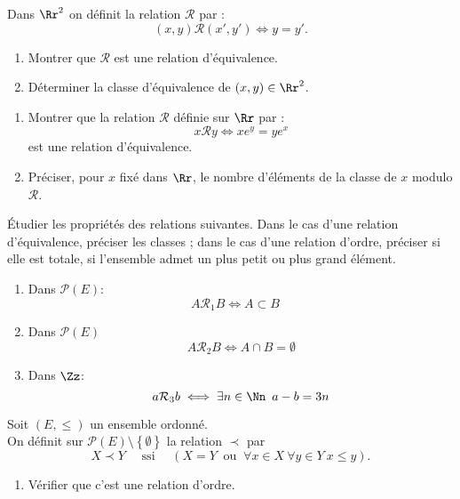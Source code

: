 \documentclass[10pt, a4paper, twocolumn]{homework}
\begin{document}
\exercice
Dans $\Rr^2$ on d\'efinit la relation $\mathcal{R}$ par :
$$(x,y)\mathcal{R}(x',y')\Leftrightarrow y=y'.$$
\begin{enumerate}
    \item Montrer que $\mathcal{R}$ est une relation d'\'equivalence.
    \item D\'eterminer la classe d'\'equivalence de $(x,y)\in \Rr^2$.
\end{enumerate}
\exercice
\begin{enumerate}
  \item
Montrer que la relation $\mathcal{R}$ d\'{e}finie sur $\Rr$ par :
$$x\mathcal{R} y\Longleftrightarrow xe^{y}=ye^{x}$$
est une relation d'\'{e}quivalence.
\item
Pr\'{e}ciser, pour $x$ fix\'{e} dans $\Rr$, le nombre d'\'{e}l\'{e}ments de
la classe de $x$ modulo $\mathcal{R}$.
\end{enumerate}
\exercice
\'Etudier les propri\'et\'es des relations suivantes. Dans le cas
d'une relation d'\'equivalence, pr\'eciser les classes ; dans le cas
d'une relation d'ordre, pr\'eciser si elle est totale, si l'ensemble admet
un plus petit ou plus grand \'el\'ement.
\begin{enumerate}
    \item Dans $\mathcal{P}(E)$:
      $$A\mathcal{R}_1 B \iff A\subset B\quad$$

    \item Dans $\mathcal{P}(E)$ $$A\mathcal{R}_2 B \iff A\cap
      B=\emptyset$$
    \item Dans $\Zz$:
$$ a\mathcal{R}_3 b \iff \exists n\in \Nn \ \,a-b=3n$$
\end{enumerate}
\exercice
Soit $ (E, \leq)$ un ensemble ordonn\'e.\\
On d\'efinit sur $\mathcal{P} (E)\setminus\left\{ \emptyset \right\}$ la relation
$\prec$ par 
$$X \prec Y \quad \text{ ssi } \quad (X = Y \ \text{ ou } \ 
\forall x \in X \  \forall y \in Y \  x \leq y).$$ 
\begin{enumerate}
  \item  V\'erifier que c'est une relation d'ordre.
\end{enumerate}

\end{document}
